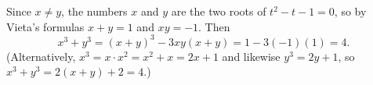 Since $x\ne y$, the numbers $x$ and $y$ are the two roots of $t^2-t-1=0$, so by Vieta's formulas $x+y=1$ and $xy=-1$. Then
\[
x^3+y^3=(x+y)^3-3xy(x+y)=1-3(-1)(1)=\boxed{4}.
\]
(Alternatively, $x^3=x\cdot x^2=x^2+x=2x+1$ and likewise $y^3=2y+1$, so $x^3+y^3=2(x+y)+2=4$.)
